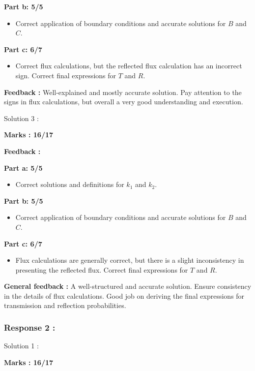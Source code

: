 \documentclass[a4paper,11pt]{article}
\begin{document}
\textbf{Part b: 5/5}
\begin{itemize}
    \item Correct application of boundary conditions and accurate solutions for $B$ and $C$.
\end{itemize}

\textbf{Part c: 6/7}
\begin{itemize}
    \item Correct flux calculations, but the reflected flux calculation has an incorrect sign. Correct final expressions for $T$ and $R$.
\end{itemize}


\textbf{Feedback :}
Well-explained and mostly accurate solution. Pay attention to the signs in flux calculations, but overall a very good understanding and execution.


Solution 3 :


\textbf{Marks : 16/17}

\textbf{Feedback :}

\textbf{Part a: 5/5}
\begin{itemize}
    \item Correct solutions and definitions for $k_1$ and $k_2$.
\end{itemize}


\textbf{Part b: 5/5}
\begin{itemize}
    \item Correct application of boundary conditions and accurate solutions for $B$ and $C$.
\end{itemize}

\textbf{Part c: 6/7}
\begin{itemize}
    \item Flux calculations are generally correct, but there is a slight inconsistency in presenting the reflected flux. Correct final expressions for $T$ and $R$.
\end{itemize}


\textbf{General feedback :}
A well-structured and accurate solution. Ensure consistency in the details of flux calculations. Good job on deriving the final expressions for transmission and reflection probabilities.

\subsubsection*{Response 2 :}

Solution 1 : 

\textbf{Marks : 16/17}
\end{document}
